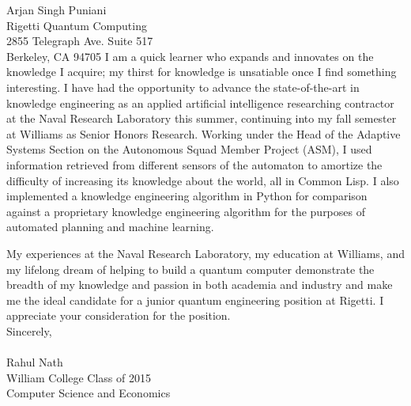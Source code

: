 \documentclass[11pt]{letter} %
\newcommand{\forceindent}{\leavevmode{\parindent=24pt\indent}}
\begin{document}
\begin{letter}{Arjan Singh Puniani \\
Rigetti Quantum Computing \\
2855 Telegraph Ave. Suite 517\\
Berkeley, CA 94705}
\forceindent I am a quick learner who expands and innovates on the knowledge I acquire; my thirst for knowledge is unsatiable once I find something interesting. I have had the opportunity to advance the state-of-the-art in knowledge engineering as an applied artificial intelligence researching contractor at the Naval Research Laboratory this summer, continuing into my fall semester at Williams as Senior Honors Research. Working under the Head of the Adaptive Systems Section on the Autonomous Squad Member Project (ASM), I used information retrieved from different sensors of the automaton to amortize the difficulty of increasing its knowledge about the world, all in Common Lisp. I also implemented a knowledge engineering algorithm in Python for comparison against a proprietary knowledge engineering algorithm for the purposes of automated planning and machine learning.

\forceindent My experiences at the Naval Research Laboratory, my education at Williams, and my lifelong dream of helping to build a quantum computer demonstrate the breadth of my knowledge and passion in both academia and industry and make me the ideal candidate for a junior quantum engineering position at Rigetti. I appreciate your consideration for the position. \\

Sincerely,\\ \\
Rahul Nath \\
William College Class of 2015  \\
Computer Science and Economics


\end{letter}
\end{document}
